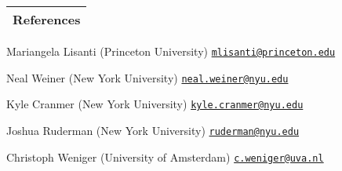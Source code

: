 \documentclass[11pt]{article}
\newenvironment{packed_itemize}{
\begin{itemize}[label=\raisebox{0.25ex}{\tiny$\bullet$}]
  \setlength{\itemsep}{3pt}
  \setlength{\parskip}{0pt}
  \setlength{\parsep}{0pt}}{\end{itemize}
}
\begin{document}

\noindent
\begin{tabular*}{\textwidth}{l@{\extracolsep{\fill}}}
\large {\sc \Large{References}}\\
\hline
\end{tabular*}\vspace{1.5mm}
\begin{packed_itemize}
  \item Mariangela Lisanti (Princeton University) \hfill \href{mailto:mlisanti@princeton.edu}{\texttt{mlisanti@princeton.edu}}
  \item Neal Weiner (New York University) \hfill \href{mailto:neal.weiner@nyu.edu}{\texttt{neal.weiner@nyu.edu}}
  \item Kyle Cranmer (New York University) \hfill \href{mailto:kyle.cranmer@nyu.edu}{\texttt{kyle.cranmer@nyu.edu}}
  \item Joshua Ruderman (New York University) \hfill \href{mailto:ruderman@nyu.edu}{\texttt{ruderman@nyu.edu}}
  \item Christoph Weniger (University of Amsterdam) \hfill \href{mailto:c.weniger@uva.nl}{\texttt{c.weniger@uva.nl}}
\end{packed_itemize}

\vspace*{\fill}
\end{document}
